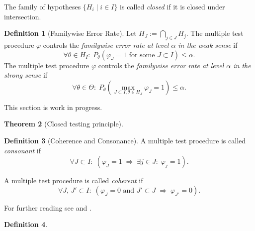 \documentclass[a4paper, 10pt]{article}\usepackage[]{graphicx}\usepackage[]{color}
\numberwithin{equation}{section}
\theoremstyle{definition}
\newtheorem{Def}{Definition}[section]
\theoremstyle{plain}
\newtheorem{Theorem}[Def]{Theorem}
\renewcommand{\phi}{\varphi}
\begin{document}
\begin{appendix}
The family of hypotheses $\{H_i \;|\;i\in I\}$ is called
\emph{closed} if it is closed under intersection. 

\begin{Def}[Familywise Error Rate]
  Let $H_J:=\bigcap_{j\in J} H_j$. The multiple test procedure $\phi$
  controls the \emph{familywise error rate at level $\alpha$ in the
    weak sense} if
  \[\forall \theta\in H_I: \; P_\theta(\phi_J=1\text{ for some }J\subset I)\leq\alpha.\]
  The multiple test procedure $\phi$ controls the \emph{familywise
    error rate at level $\alpha$ in the strong sense} if
  \[\forall \theta\in\Theta: \; P_\theta\left(\max\limits_{J\subset I, \theta\in H_J}\phi_J=1\right)\leq\alpha.\]
\end{Def}

This section is work in progress.

\begin{Theorem}[Closed testing principle]
 \cite{marcus1976closed}
\end{Theorem}

\begin{Def}[Coherence and Consonance]
  A multiple test procedure is called \emph{consonant} if 
  \[\forall J\subset I:\; \left(\phi_J=1\;\Rightarrow\;\exists j\in J:\;\phi_j=1\right).\]

  A multiple test procedure is called \emph{coherent} if
  \[\forall J,\,J'\subset I:\; \left(\phi_J=0\text{ and }J'\subset J\;\Rightarrow\;\phi_{J'}=0\right).\]

  For further reading see
  \cite{hochberg2009multiple} and \cite{gabriel1969simultaneous}.
\end{Def}


\begin{Def}


\end{Def}
\end{appendix}
\end{document}
